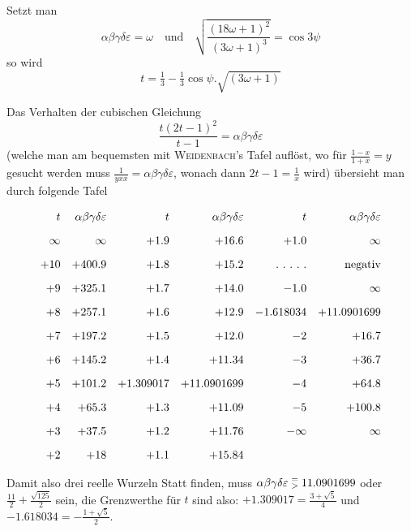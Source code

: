 Setzt man
\[
\alpha\beta\gamma\delta\varepsilon=\omega\quad\text{und}\quad \surd{\frac{(18\omega+1)^2}{(3\omega+1)^{3}}}=\cos3\psi
\]
so wird
\[
t=\tfrac13-\tfrac13\cos\psi\mathord{.}\surd{(3\omega+1)}
\]

Das Verhalten der cubischen Gleichung
\[
\frac{t(2t-1)^2}{t-1}=\alpha\beta\gamma\delta\varepsilon
\]
(welche man am bequemsten mit \textsc{Weidenbach}'s Tafel auflöst, wo für
$\frac{1-x}{1+x}=y$
gesucht werden muss $\frac{1}{yxx}=\alpha\beta\gamma\delta\varepsilon$, wonach dann
$2t-1=\frac1x$ wird) übersieht man durch folgende Tafel



\par\nopagebreak%
\begingroup\small\setlength{\arraycolsep}{2pt}\[
\begin{array}{r@{\quad}r@{\quad}r@{\quad}r@{\quad}r@{\quad}r} t&\alpha\beta\gamma\delta\varepsilon&t&\alpha\beta\gamma\delta\varepsilon&t&\alpha\beta\gamma\delta\varepsilon\\[9pt] \infty&\infty&+1.9&+16.6&+1.0&\infty\\[9pt] +10&+400.9&+1.8&+15.2&\mathord{.}\ \mathord{.}\ \mathord{.}\ \mathord{.}\ \mathord{.}&\text{negativ}\\[9pt] +9&+325.1&+1.7&+14.0&-1.0&\infty\\[9pt] +8&+257.1&+1.6&+12.9&-1.618034&+11.0901699\\[9pt] +7&+197.2&+1.5&+12.0&-2&+16.7\\[9pt] +6&+145.2&+1.4&+11.34&-3&+36.7\\[9pt] +5&+101.2&+1.309017&+11.0901699&-4&+64.8\\[9pt] +4&+65.3&+1.3&+11.09&-5&+100.8\\[9pt] +3&+37.5&+1.2&+11.76&-\infty&\infty\\[9pt] +2&+18&+1.1&+15.84&& \end{array}
\]\endgroup\par%


Damit also drei reelle Wurzeln Statt finden, muss
$\alpha\beta\gamma\delta\varepsilon\mathrel{\substack{=\\>}}11.0901699$
oder $\frac{11}{2}+\frac{\surd{125}}{2}$ sein, die Grenzwerthe für $t$ sind also:
$+1.309017=\frac{3+\surd5}{4}$ und $-1.618034=-\frac{1+\surd5}{2}$.

